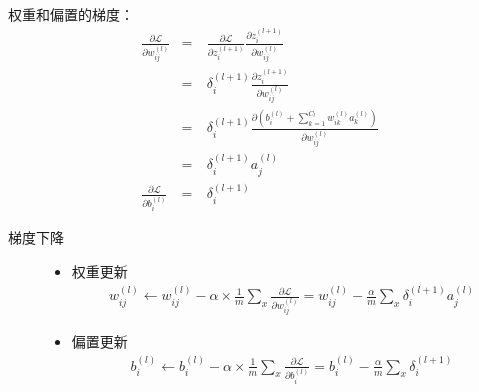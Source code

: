 \documentclass[letterpaper,10pt,english]{sphinxmanual}
\begin{document}
权重和偏置的梯度：
\begin{equation*}
\begin{split}\frac{\partial{\mathcal{L}}}{\partial{w_{ij}^{(l)}}} & = & \  \frac{\partial{\mathcal{L}}}{\partial{z^{(l+1)}_i}} \frac{\partial{z^{(l+1)}_i}}{\partial{w_{ij}^{(l)}}} \\
                                                   & = & \  \delta^{(l+1)}_i \frac{\partial{z^{(l+1)}_i}}{\partial{w_{ij}^{(l)}}} \\
                                                   & = & \  \delta^{(l+1)}_i \frac{\partial{\left ( b^{(l)}_i + \sum_{k=1}^{C_l}w^{(l)}_{ik}a^{(l)}_k \right )}}{\partial{w_{ij}^{(l)}}} \\
                                                   & = & \  \delta^{(l+1)}_i a^{(l)}_j \\
\frac{\partial{\mathcal{L}}}{\partial{b_i^{(l)}}} & = & \  \delta^{(l+1)}_i\end{split}
\end{equation*}\begin{description}
\item[{梯度下降}] \leavevmode\begin{itemize}
\item {} 
权重更新
\begin{equation*}
\begin{split}w_{ij}^{(l)} \leftarrow w_{ij}^{(l)} - \alpha \times \frac{1}{m} \sum_x \frac{\partial{\mathcal{L}}}{\partial{w_{ij}^{(l)}}} = w_{ij}^{(l)} - \frac{\alpha}{m} \sum_x \delta^{(l+1)}_i a^{(l)}_j\end{split}
\end{equation*}
\item {} 
偏置更新
\begin{equation*}
\begin{split}b_i^{(l)}  \leftarrow b_i^{(l)} - \alpha \times \frac{1}{m} \sum_x \frac{\partial{\mathcal{L}}}{\partial{b_i^{(l)}}} = b_i^{(l)} - \frac{\alpha}{m} \sum_x \delta^{(l+1)}_i\end{split}
\end{equation*}
\end{itemize}

\end{description}
\end{document}

